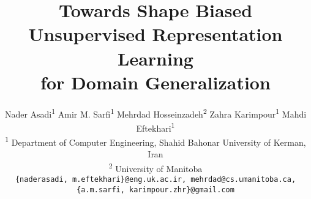 \documentclass[10pt,twocolumn,letterpaper]{article}
\begin{document}
\title{Towards Shape Biased Unsupervised Representation Learning\\for Domain Generalization}

\author{Nader Asadi\textsuperscript{\rm 1} \quad Amir M. Sarfi\textsuperscript{\rm 1} \quad Mehrdad Hosseinzadeh\textsuperscript{\rm 2} \quad Zahra Karimpour\textsuperscript{\rm 1} \quad Mahdi Eftekhari\textsuperscript{\rm 1} \\
	\textsuperscript{\rm 1} \normalsize Department of Computer Engineering, Shahid Bahonar University of Kerman, Iran\\
	\textsuperscript{\rm 2} \normalsize University of Manitoba\\
	{\tt\small \{naderasadi, m.eftekhari\}@eng.uk.ac.ir, mehrdad@cs.umanitoba.ca, \{a.m.sarfi, karimpour.zhr\}@gmail.com}
}

\maketitle
\end{document}

